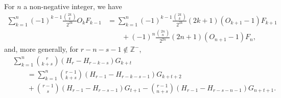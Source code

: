 \documentclass[12pt,reqno]{article}
\begin{document}
	
	\begin{theorem}\label{thm.p5cp11r}
		For $n$ a non-negative integer, we have
		\begin{equation}\label{eq.lt63xqk}
			\begin{split}
				\sum_{k = 1}^n {\left( { - 1} \right)^{k - 1} \frac{{\binom{{2k}}{k}}}{{2^{2k} }}O_k F_{k - 1} }  &= \sum_{k = 1}^n {\left( { - 1} \right)^{k - 1} \frac{{\binom{{2k}}{k}}}{{2^{2k} }}\left( {2k + 1} \right)\left( {O_{k + 1}  - 1} \right)F_{k + 1} } \\
				&\qquad + \left( { - 1} \right)^n \frac{{\binom{{2n}}{n}}}{{2^{2n} }}\left( {2n + 1} \right)\left( {O_{n + 1}  - 1} \right)F_n ,
			\end{split}
		\end{equation}
		and, more generally, for $r-n-s-1\not\in\mathbb Z^{-}$,
		\begin{equation}\label{eq.zmuo9et}
			\begin{split}
				&\sum_{k = 1}^n {\binom{{r}}{{k + s}}\left( {H_r  - H_{r - k - s} } \right)G_{k + t} } \\
				&\qquad= \sum_{k = 1}^n {\binom{{r - 1}}{{k + s}}\left( {H_{r - 1}  - H_{r - k - s - 1} } \right)G_{k + t + 2} }\\
				&\qquad + \binom{{r - 1}}{s}\left( {H_{r - 1}  - H_{r - s - 1} } \right)G_{t + 1}  - \binom{{r - 1}}{{n + s}}\left( {H_{r - 1}  - H_{r - s - n - 1} } \right)G_{n + t + 1} .
			\end{split}
		\end{equation}
	\end{theorem}
\end{document}

